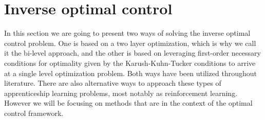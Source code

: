 \documentclass[12pt, a4paper]{article}
\begin{document}
\section{Inverse optimal control} \label{Inverse optimal control}
In this section we are going to present two ways of solving the inverse optimal control problem. One is based on a two layer optimization, which is why we call it the bi-level approach, and the other is based on leveraging first-order necessary conditions for optimality given by the Karush-Kuhn-Tucker conditions to arrive at a single level optimization problem. Both ways have been utilized throughout literature. There are also alternative ways to approach these types of apprenticeship learning problems, most notably as reinforcement learning. However we will be focusing on methods that are in the context of the optimal control framework.
\end{document}
